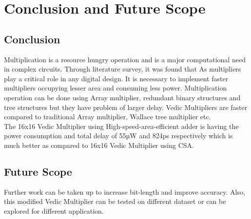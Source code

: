 \chapter{Conclusion and Future Scope}

\section{Conclusion}
Multiplication is a resource hungry operation and is a major computational need in complex circuits. Through literature survey, it was found that As multipliers play a critical role in any digital design. It is necessary to implement faster multipliers occupying lesser area and consuming less power. Multiplication operation can be done using Array multiplier, redundant binary structures and tree structures but they have problem of larger delay. Vedic Multipliers are faster compared to traditional Array multiplier, Wallace tree multiplier etc.\\
The 16x16 Vedic Multiplier using High-speed-area-efficient adder is having the power consumption and total delay of 55µW and 824ps respectively which is much better as compared to 16x16 Vedic Multiplier using CSA.


\section{Future Scope}
Further work can be taken up to increase bit-length and improve accuracy. Also, this modified Vedic Multiplier can be tested on different dataset or can be explored for different application.


